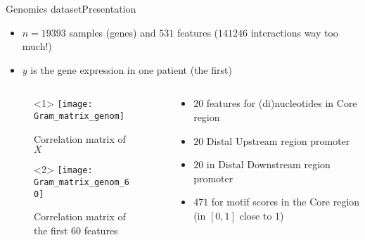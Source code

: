 \documentclass[10pt,aspectratio=43]{beamer}
\begin{document}
\begin{frame}{Genomics dataset}{Presentation}
\begin{itemize}
    \item $n=19393$ samples (genes) and $531$ features ($141246$ interactions
    \ie way too much!)
    \item $y$ is the gene expression in one patient (the first)
\end{itemize}

\begin{columns}
\begin{column}{.5\textwidth}
    \begin{figure}
        \centering
    \begin{onlyenv}<1>
        \texttt{[image: Gram\_matrix\_genom]}
        \caption*{Correlation matrix of $X$}
    \end{onlyenv}
    \begin{onlyenv}<2>
        \texttt{[image: Gram\_matrix\_genom\_60]}
        \caption*{Correlation matrix of the first $60$ features}
    \end{onlyenv}
    \end{figure}
\end{column}
\begin{column}{.6\textwidth}
    \begin{itemize}
        \item $20$ features for (di)nucleotides in Core region
        \item $20$ Distal Upstream region promoter
        \item $20$ in Distal Downstream region promoter
        \item $471$ for motif scores in the Core region (in $[0,1]$
        close to $1$)
    \end{itemize}
\end{column}
\end{columns}
\end{frame}
\end{document}

